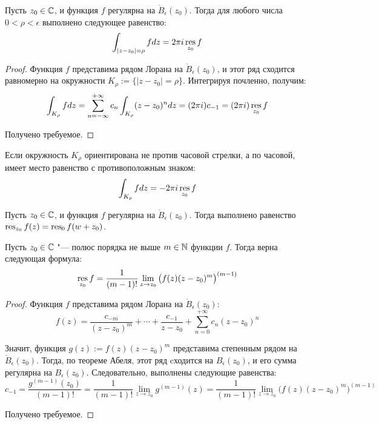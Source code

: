 \begin{proposition}
	Пусть $z_0 \in \mathbb{C}$, и функция $f$ регулярна на $\mathring B_\epsilon(z_0)$. Тогда для любого числа $0 < \rho < \epsilon$ выполнено следующее равенство:
	\[\int_{|z - z_0| = \rho}fdz = 2\pi i\operatorname*{res}_{z_0}f\]
\end{proposition}

\begin{proof}
	Функция $f$ представима рядом Лорана на $\mathring B_\epsilon(z_0)$, и этот ряд сходится равномерно на окружности $K_\rho:= \{|z - z_0| = \rho\}$. Интегрируя почленно, получим:
	\[\int_{K_\rho}fdz = \sum\limits_{n = -\infty}^{+\infty}c_n\int_{K_\rho}(z-z_0)^ndz = (2\pi i)c_{-1} = (2\pi i)\operatorname*{res}_{z_0}f\]
	
	Получено требуемое.
\end{proof}

\begin{note}
	Если окружность $K_\rho$ ориентирована не против часовой стрелки, а по часовой, имеет место равенство с противоположным знаком:
	\[\int_{K_\rho}fdz = -2\pi i\operatorname*{res}_{z_0}f\]
\end{note}

\begin{note}
	Пусть $z_0 \in \mathbb{C}$, и функция $f$ регулярна на $\mathring B_\epsilon(z_0)$. Тогда выполнено равенство $\operatorname*{res}_{z_0}f(z) = \operatorname*{res}_0f(w + z_0)$.
\end{note}

\begin{proposition}
	Пусть $z_0 \in \mathbb{C}$ "--- полюс порядка не выше $m \in \mathbb{N}$ функции $f$. Тогда верна следующая формула:
	\[\operatorname*{res}_{z_0}f = \frac{1}{(m-1)!}\lim_{z \to z_0}\big(f(z)(z - z_0)^m\big)^{(m-1)}\]
\end{proposition}

\begin{proof}
	Функция $f$ представима рядом Лорана на $\mathring B_\epsilon(z_0)$:
	\[f(z) = \frac{c_{-m}}{(z-z_0)^m} + \dotsb + \frac{c_{-1}}{z-z_0} + \sum_{n = 0}^{+\infty}c_n(z - z_0)^n\]
	
	Значит, функция $g(z) := f(z)(z-z_0)^m$ представима степенным рядом на $\mathring B_\epsilon(z_0)$. Тогда, по теореме Абеля, этот ряд cходится на $B_\epsilon(z_0)$, и его сумма регулярна на $B_\epsilon(z_0)$. Следовательно, выполнены следующие равенства:
	\[c_{-1} = \frac{g^{(m-1)}(z_0)}{(m-1)!} = \frac1{{(m-1)!}}\lim_{z \to z_0}g^{(m-1)}(z) = \frac{1}{(m-1)!}\lim_{z \to z_0}\big(f(z)(z - z_0)^m\big)^{(m-1)}\]
	
	Получено требуемое.
\end{proof}

